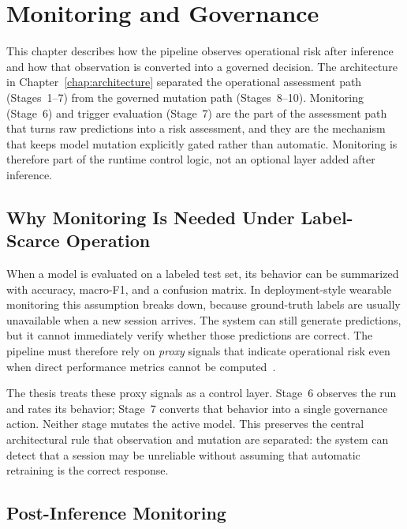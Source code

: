 \chapter{Monitoring and Governance}
\label{chap:monitoring}

This chapter describes how the pipeline observes operational risk after inference and how that
observation is converted into a governed decision. The architecture in Chapter~\ref{chap:architecture}
separated the operational assessment path (Stages~1--7) from the governed mutation path
(Stages~8--10). Monitoring (Stage~6) and trigger evaluation (Stage~7) are the part of the assessment
path that turns raw predictions into a risk assessment, and they are the mechanism that keeps model
mutation explicitly gated rather than automatic. Monitoring is therefore part of the runtime control logic, not an optional layer added after inference.

\section{Why Monitoring Is Needed Under Label-Scarce Operation}
\label{sec:why_monitoring}

When a model is evaluated on a labeled test set, its behavior can be summarized with accuracy,
macro-F1, and a confusion matrix. In deployment-style wearable monitoring this assumption breaks
down, because ground-truth labels are usually unavailable when a new session arrives. The system can
still generate predictions, but it cannot immediately verify whether those predictions are correct.
The pipeline must therefore rely on \emph{proxy} signals that indicate operational risk even when
direct performance metrics cannot be computed~\cite{bodor2023mlopsmonitoring}.

The thesis treats these proxy signals as a control layer. Stage~6 observes the run and rates its
behavior; Stage~7 converts that behavior into a single governance action. Neither stage mutates the
active model. This preserves the central architectural rule that observation and mutation are
separated: the system can detect that a session may be unreliable without assuming that automatic
retraining is the correct response.

\section{Post-Inference Monitoring}
\label{sec:three_layer_monitoring}

